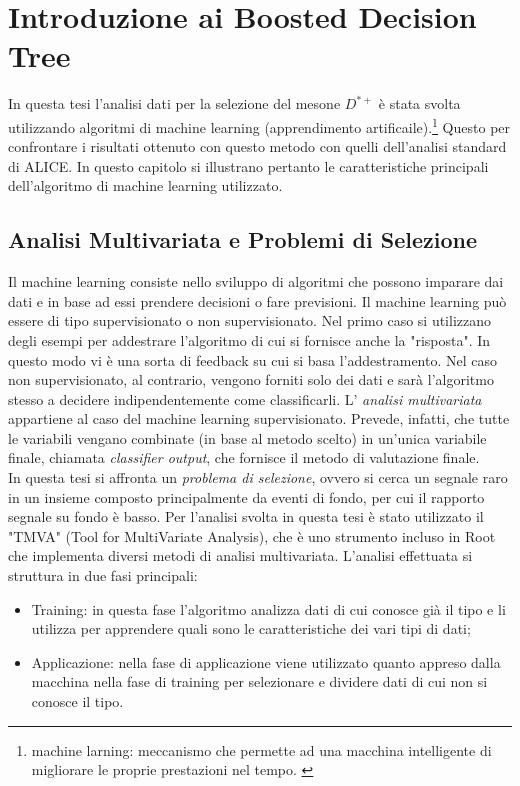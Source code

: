 \chapter{Introduzione ai Boosted Decision Tree}

In questa tesi l'analisi dati per la selezione del mesone $D^{*+}$ \`e stata svolta utilizzando algoritmi di machine learning (apprendimento artificaile).\footnote{machine larning: meccanismo che permette ad una macchina intelligente di migliorare le proprie prestazioni nel tempo. \cite{sitoMachineLearning}} Questo per confrontare i risultati ottenuto con questo metodo con quelli dell'analisi standard di ALICE. In questo capitolo si illustrano pertanto le caratteristiche principali dell'algoritmo di machine learning utilizzato.  

\section{Analisi Multivariata e Problemi di Selezione} \label{AnalisiMulti}
Il machine learning consiste nello sviluppo di algoritmi che possono imparare dai dati e in base ad essi prendere decisioni o fare previsioni. Il machine learning può essere di tipo supervisionato o non supervisionato. Nel primo caso si utilizzano degli esempi per addestrare l'algoritmo di cui si fornisce anche la "risposta". In questo modo vi è una sorta di feedback su cui si basa l'addestramento. Nel caso non supervisionato, al contrario, vengono forniti solo dei dati e sarà l'algoritmo stesso a decidere indipendentemente come classificarli. L' \textit{analisi multivariata}  appartiene al caso del machine learning supervisionato. Prevede, infatti, che tutte le variabili vengano combinate (in base al metodo scelto) in un'unica variabile finale, chiamata \textit{classifier output}, che fornisce il metodo di valutazione finale.
\\In questa tesi si affronta un \textit{problema di selezione}, ovvero si cerca un segnale raro in un insieme composto principalmente da eventi di fondo, per cui il rapporto segnale su fondo \`e basso.
Per l'analisi svolta in questa tesi \`e stato utilizzato il "TMVA" (Tool for MultiVariate Analysis), che \`e uno strumento incluso in Root che implementa diversi metodi di analisi multivariata. L'analisi effettuata si struttura in due fasi principali:
    \begin{itemize}
        \item Training: in questa fase l'algoritmo analizza dati di cui conosce gi\`a il tipo e li utilizza per apprendere quali sono le caratteristiche dei vari tipi di dati;
        \item Applicazione: nella fase di applicazione viene utilizzato quanto appreso dalla macchina nella fase di training per selezionare e dividere dati di cui non si conosce il tipo.
    \end{itemize}
    

